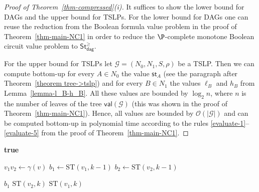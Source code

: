 \documentclass[a4paper,UKenglish,cleveref, autoref, thm-restate, numberwithinsect]{lipics-v2021}
\newcommand{\val}{\mathsf{val}}
\newcommand{\hs}{\mathsf{st}}
\newcommand{\StN}{\mathsf{St}^\ge}
\newcommand{\StNdag}{\StN_{\mathsf{dag}}}
\begin{document}
\begin{proof}[Proof of Theorem~\ref{thm-compressed}(i)]
It suffices to show the lower bound for DAGs and the upper bound for TSLPs.
For the lower bound for DAGs one can reuse the reduction from the Boolean formula value problem
in the proof of Theorem~\ref{thm-main-NC1} in order to reduce the $\P$-complete monotone Boolean circuit value 
problem to $\StNdag$.

For the upper bound for TSLPs let $\mathcal{G} = (N_0, N_1, S, \rho)$ be a TSLP. Then we can compute 
bottom-up for every $A \in N_0$ the value $\hs_A$ (see the paragraph after Theorem~\ref{theorem tree->tslp})
and for every $B \in N_1$ the values $\ell_B$ and $h_B$ 
from Lemma~\ref{lemma-l_B-h_B}. All these values are bounded by 
$\log_2 n$, where $n$ is the number of leaves of the tree $\val(\mathcal{G})$
(this was shown in the proof of Theorem~\ref{thm-main-NC1}).  Hence, all values are bounded
by $\mathcal{O}(|\mathcal{G}|)$ and can be computed bottom-up in polynomial time according to the rules \eqref{evaluate-1}--\eqref{evaluate-5}
from the proof of Theorem~\ref{thm-main-NC1}.
\end{proof}


\begin{algorithm}
\caption{Recursive Strahler number computation}
\label{algo:rec}
\begin{algorithmic}[1]
            \State \Return \textbf{true}
        \EndIf
        
        \State $v_1 v_2 \gets \gamma(v)$ %
        \State $b_1 \gets \text{ST}(v_1, k - 1)$  \label{rec1} 
        \State $b_2 \gets \text{ST}(v_2, k - 1)$ \label{rec2}
        
            \State \Return $b_1$ \label{case1}
            \State \Return $\text{ST}(v_2, k)$ \label{case2}
            \State \Return $\text{ST}(v_1, k)$ \label{case3}
        \EndIf
    \EndProcedure
\end{algorithmic}
\end{algorithm}
\end{document}
